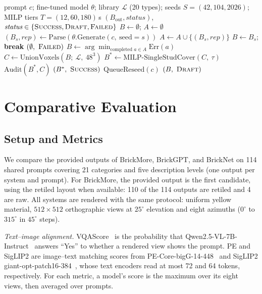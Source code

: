\documentclass[letterpaper]{article} %
\begin{document}
\begin{algorithm}[t]
\caption{BrickMore inference and retiling}
\label{alg:inference-retiling}
\small
\begin{algorithmic}[1]
\REQUIRE prompt $c$; fine-tuned model $\theta$; library $\mathcal{L}$ (20 types); seeds $S=(42,104,2026)$; MILP tiers $T=(12,60,180)$\,s
\ENSURE $(B_{\mathrm{out}}, \textit{status})$, $\textit{status}\in\{\textsc{Success},\textsc{Draft},\textsc{Failed}\}$
\STATE $B \gets \emptyset$; $A \gets \emptyset$
  \STATE $(B_s,\textit{rep}) \gets \mathrm{Parse}(\theta.\mathrm{Generate}(c,\ \mathrm{seed}{=}s))$
  \STATE $A \gets A \cup \{(B_s,\textit{rep})\}$
    \STATE $B \gets B_s$; \textbf{break}
  \ENDIF
\ENDFOR
{}
    \RETURN $(\emptyset,\ \textsc{Failed})$
  \ENDIF
  \STATE $B \gets \arg\min_{\text{completed } a\in A} \mathrm{Err}(a)$
\ENDIF
\STATE $C \gets \mathrm{UnionVoxels}(B;\ \mathcal{L},\ 48^3)$ 
  \STATE $B^{*} \gets \mathrm{MILP\text{-}SingleStudCover}(C,\ \tau)$
    \STATE $\mathrm{Audit}(B^{*},C)$ 
    \RETURN $(B^{*},\ \textsc{Success})$
  \ENDIF
\ENDFOR
\STATE $\mathrm{QueueReseed}(c)$
\RETURN $(B,\ \textsc{Draft})$ 
\end{algorithmic}
\end{algorithm}

\section{Comparative Evaluation}
\label{sec:eval}
\subsection{Setup and Metrics}
We compare the provided outputs of BrickMore, BrickGPT, and BrickNet on 114 shared prompts covering 21 categories and five description levels (one output per system and prompt). For BrickMore, the provided output is the first candidate, using the retiled layout when available: 110 of the 114 outputs are retiled and 4 are raw. All systems are rendered with the same protocol: uniform yellow material, $512{\times}512$ orthographic views at $25^{\circ}$ elevation and eight azimuths ($0^{\circ}$ to $315^{\circ}$ in $45^{\circ}$ steps).

\emph{Text--image alignment.} VQAScore~\cite{vqascore} is the probability that Qwen2.5-VL-7B-Instruct~\cite{qwen25vl} answers ``Yes'' to whether a rendered view shows the prompt. PE and SigLIP2 are image--text matching scores from PE-Core-bigG-14-448~\cite{pe} and SigLIP2 giant-opt-patch16-384~\cite{siglip2}, whose text encoders read at most 72 and 64 tokens, respectively. For each metric, a model's score is the maximum over its eight views, then averaged over prompts.
\end{document}
